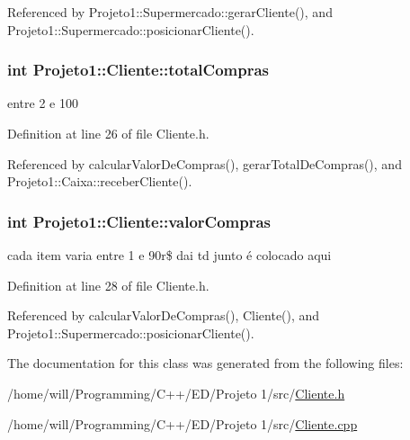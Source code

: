 Referenced by Projeto1::Supermercado::gerarCliente(), and Projeto1::Supermercado::posicionarCliente().

\hypertarget{classProjeto1_1_1Cliente_ae6670b6e5ba64ee23f9798845df586a5}{
\subsubsection[{totalCompras}]{\setlength{\rightskip}{0pt plus 5cm}int {\bf Projeto1::Cliente::totalCompras}}}
\label{classProjeto1_1_1Cliente_ae6670b6e5ba64ee23f9798845df586a5}
entre 2 e 100 

Definition at line 26 of file Cliente.h.



Referenced by calcularValorDeCompras(), gerarTotalDeCompras(), and Projeto1::Caixa::receberCliente().

\hypertarget{classProjeto1_1_1Cliente_a37b32637d513c756c817415f618d8d9d}{
\subsubsection[{valorCompras}]{\setlength{\rightskip}{0pt plus 5cm}int {\bf Projeto1::Cliente::valorCompras}}}
\label{classProjeto1_1_1Cliente_a37b32637d513c756c817415f618d8d9d}
cada item varia entre 1 e 90r\$ dai td junto é colocado aqui 

Definition at line 28 of file Cliente.h.



Referenced by calcularValorDeCompras(), Cliente(), and Projeto1::Supermercado::posicionarCliente().



The documentation for this class was generated from the following files:\begin{DoxyCompactItemize}
\item 
/home/will/Programming/C++/ED/Projeto 1/src/\hyperlink{Cliente_8h}{Cliente.h}\item 
/home/will/Programming/C++/ED/Projeto 1/src/\hyperlink{Cliente_8cpp}{Cliente.cpp}\end{DoxyCompactItemize}
